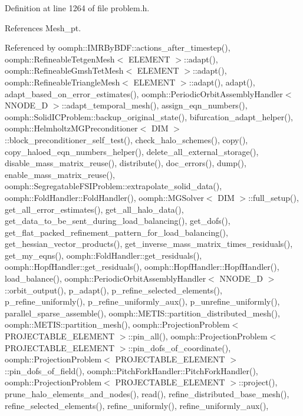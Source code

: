Definition at line 1264 of file problem.\+h.



References Mesh\+\_\+pt.



Referenced by oomph\+::\+I\+M\+R\+By\+B\+D\+F\+::actions\+\_\+after\+\_\+timestep(), oomph\+::\+Refineable\+Tetgen\+Mesh$<$ E\+L\+E\+M\+E\+N\+T $>$\+::adapt(), oomph\+::\+Refineable\+Gmsh\+Tet\+Mesh$<$ E\+L\+E\+M\+E\+N\+T $>$\+::adapt(), oomph\+::\+Refineable\+Triangle\+Mesh$<$ E\+L\+E\+M\+E\+N\+T $>$\+::adapt(), adapt(), adapt\+\_\+based\+\_\+on\+\_\+error\+\_\+estimates(), oomph\+::\+Periodic\+Orbit\+Assembly\+Handler$<$ N\+N\+O\+D\+E\+\_\+D $>$\+::adapt\+\_\+temporal\+\_\+mesh(), assign\+\_\+eqn\+\_\+numbers(), oomph\+::\+Solid\+I\+C\+Problem\+::backup\+\_\+original\+\_\+state(), bifurcation\+\_\+adapt\+\_\+helper(), oomph\+::\+Helmholtz\+M\+G\+Preconditioner$<$ D\+I\+M $>$\+::block\+\_\+preconditioner\+\_\+self\+\_\+test(), check\+\_\+halo\+\_\+schemes(), copy(), copy\+\_\+haloed\+\_\+eqn\+\_\+numbers\+\_\+helper(), delete\+\_\+all\+\_\+external\+\_\+storage(), disable\+\_\+mass\+\_\+matrix\+\_\+reuse(), distribute(), doc\+\_\+errors(), dump(), enable\+\_\+mass\+\_\+matrix\+\_\+reuse(), oomph\+::\+Segregatable\+F\+S\+I\+Problem\+::extrapolate\+\_\+solid\+\_\+data(), oomph\+::\+Fold\+Handler\+::\+Fold\+Handler(), oomph\+::\+M\+G\+Solver$<$ D\+I\+M $>$\+::full\+\_\+setup(), get\+\_\+all\+\_\+error\+\_\+estimates(), get\+\_\+all\+\_\+halo\+\_\+data(), get\+\_\+data\+\_\+to\+\_\+be\+\_\+sent\+\_\+during\+\_\+load\+\_\+balancing(), get\+\_\+dofs(), get\+\_\+flat\+\_\+packed\+\_\+refinement\+\_\+pattern\+\_\+for\+\_\+load\+\_\+balancing(), get\+\_\+hessian\+\_\+vector\+\_\+products(), get\+\_\+inverse\+\_\+mass\+\_\+matrix\+\_\+times\+\_\+residuals(), get\+\_\+my\+\_\+eqns(), oomph\+::\+Fold\+Handler\+::get\+\_\+residuals(), oomph\+::\+Hopf\+Handler\+::get\+\_\+residuals(), oomph\+::\+Hopf\+Handler\+::\+Hopf\+Handler(), load\+\_\+balance(), oomph\+::\+Periodic\+Orbit\+Assembly\+Handler$<$ N\+N\+O\+D\+E\+\_\+D $>$\+::orbit\+\_\+output(), p\+\_\+adapt(), p\+\_\+refine\+\_\+selected\+\_\+elements(), p\+\_\+refine\+\_\+uniformly(), p\+\_\+refine\+\_\+uniformly\+\_\+aux(), p\+\_\+unrefine\+\_\+uniformly(), parallel\+\_\+sparse\+\_\+assemble(), oomph\+::\+M\+E\+T\+I\+S\+::partition\+\_\+distributed\+\_\+mesh(), oomph\+::\+M\+E\+T\+I\+S\+::partition\+\_\+mesh(), oomph\+::\+Projection\+Problem$<$ P\+R\+O\+J\+E\+C\+T\+A\+B\+L\+E\+\_\+\+E\+L\+E\+M\+E\+N\+T $>$\+::pin\+\_\+all(), oomph\+::\+Projection\+Problem$<$ P\+R\+O\+J\+E\+C\+T\+A\+B\+L\+E\+\_\+\+E\+L\+E\+M\+E\+N\+T $>$\+::pin\+\_\+dofs\+\_\+of\+\_\+coordinate(), oomph\+::\+Projection\+Problem$<$ P\+R\+O\+J\+E\+C\+T\+A\+B\+L\+E\+\_\+\+E\+L\+E\+M\+E\+N\+T $>$\+::pin\+\_\+dofs\+\_\+of\+\_\+field(), oomph\+::\+Pitch\+Fork\+Handler\+::\+Pitch\+Fork\+Handler(), oomph\+::\+Projection\+Problem$<$ P\+R\+O\+J\+E\+C\+T\+A\+B\+L\+E\+\_\+\+E\+L\+E\+M\+E\+N\+T $>$\+::project(), prune\+\_\+halo\+\_\+elements\+\_\+and\+\_\+nodes(), read(), refine\+\_\+distributed\+\_\+base\+\_\+mesh(), refine\+\_\+selected\+\_\+elements(), refine\+\_\+uniformly(), refine\+\_\+uniformly\+\_\+aux(), 
